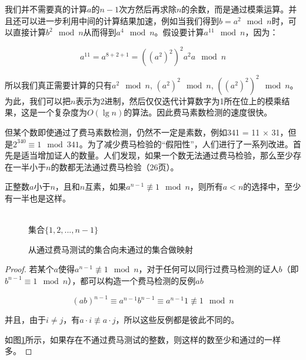 \documentclass{article}
\begin{document}
我们并不需要真的计算$a$的$n-1$次方然后再求除$n$的余数，而是通过模乘运算。并且还可以进一步利用中间的计算结果加速，例如当我们得到$b = a^2 \mod n$时，可以直接计算$b^2 \mod n$从而得到$a^4 \mod n$。假设要计算$a^{11} \mod n$，因为：

\[
a^{11} = a^{8 + 2 + 1} = ((a^2)^2)^2a^2a \mod n
\]

所以我们真正需要计算的只有$a^2 \mod n$, $(a^2)^2 \mod n$, $((a^2)^2)^2 \mod n$。为此，我们可以把$n$表示为2进制，然后仅仅迭代计算数字为1所在位上的模乘结果，这是一个复杂度为$O(\lg n)$的算法。因此费马素数检测的速度很快。

但某个数即使通过了费马素数检测，仍然不一定是素数，例如341 = 11 $\times$ 31，但是$2^{340} \equiv 1 \mod 341$。为了减少费马检验的“假阳性”，人们进行了一系列改进。首先是适当增加证人的数量。人们发现，如果一个数无法通过费马检验，那么至少存在一半小于$n$的数都无法通过费马检验\cite{Algorithms-DPV}（26页）。

\begin{theorem}
正整数$a$小于$n$，且和$n$互素，如果$a^{n-1} \not\equiv 1 \mod n$，则所有$a<n$的选择中，至少有一半也是这样。
\end{theorem}

\begin{figure}[htbp]
\centering
{} \\
集合$\{1, 2, ..., n-1\}$
\caption{从通过费马测试的集合向未通过的集合做映射}
\label{fig:Fermat-test}
\end{figure}

\begin{proof}
若某个$a$使得$a^{n-1} \not\equiv 1 \mod n$，对于任何可以同行过费马检测的证人$b$（即$b^{n-1} \equiv 1 \mod n$），都可以构造一个费马检测的反例$ab$

\[
(ab)^{n-1} \equiv a^{n-1}b^{n-1} \equiv a^{n-1}1 \not\equiv 1 \mod n
\]

并且，由于$i \neq j$，有$a \cdot i \not\equiv a \cdot j$，所以这些反例都是彼此不同的。

如图\ref{fig:Fermat-test}所示，如果存在不通过费马测试的整数，则这样的数至少和通过的一样多。
\end{proof}
\end{document}
